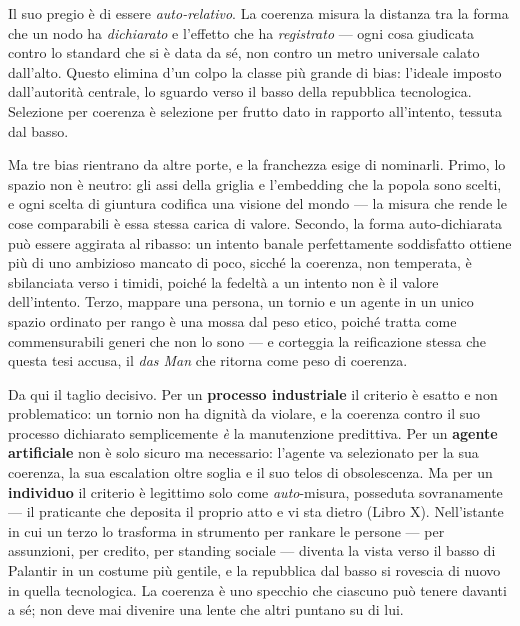 Il suo pregio \`e di essere \emph{auto-relativo}. La coerenza misura la distanza tra
la forma che un nodo ha \emph{dichiarato} e l'effetto che ha \emph{registrato} ---
ogni cosa giudicata contro lo standard che si \`e data da s\'e, non contro un metro
universale calato dall'alto. Questo elimina d'un colpo la classe pi\`u grande di
bias: l'ideale imposto dall'autorit\`a centrale, lo sguardo verso il basso della
repubblica tecnologica. Selezione per coerenza \`e selezione per frutto dato in
rapporto all'intento, tessuta dal basso.

Ma tre bias rientrano da altre porte, e la franchezza esige di nominarli. Primo, lo
spazio non \`e neutro: gli assi della griglia e l'embedding che la popola sono
scelti, e ogni scelta di giuntura codifica una visione del mondo --- la misura che
rende le cose comparabili \`e essa stessa carica di valore. Secondo, la forma
auto-dichiarata pu\`o essere aggirata al ribasso: un intento banale perfettamente
soddisfatto ottiene pi\`u di uno ambizioso mancato di poco, sicch\'e la coerenza,
non temperata, \`e sbilanciata verso i timidi, poich\'e la fedelt\`a a un intento non
\`e il valore dell'intento. Terzo, mappare una persona, un tornio e un agente in un
unico spazio ordinato per rango \`e una mossa dal peso etico, poich\'e tratta come
commensurabili generi che non lo sono --- e corteggia la reificazione stessa che
questa tesi accusa, il \emph{das Man} che ritorna come peso di coerenza.

Da qui il taglio decisivo. Per un \textbf{processo industriale} il criterio \`e
esatto e non problematico: un tornio non ha dignit\`a da violare, e la coerenza
contro il suo processo dichiarato semplicemente \emph{\`e} la manutenzione
predittiva. Per un \textbf{agente artificiale} non \`e solo sicuro ma necessario:
l'agente va selezionato per la sua coerenza, la sua escalation oltre soglia e il suo
telos di obsolescenza. Ma per un \textbf{individuo} il criterio \`e legittimo solo
come \emph{auto}-misura, posseduta sovranamente --- il praticante che deposita il
proprio atto e vi sta dietro (Libro X). Nell'istante in cui un terzo lo trasforma in
strumento per rankare le persone --- per assunzioni, per credito, per standing
sociale --- diventa la vista verso il basso di Palantir in un costume pi\`u gentile,
e la repubblica dal basso si rovescia di nuovo in quella tecnologica. La coerenza
\`e uno specchio che ciascuno pu\`o tenere davanti a s\'e; non deve mai divenire una
lente che altri puntano su di lui.

